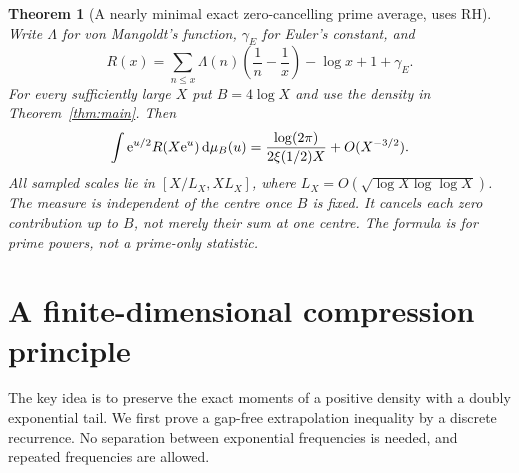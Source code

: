 \documentclass[11pt]{article}
\newtheorem{theorem}{Theorem}[section]
\theoremstyle{remark}\newtheorem{remark}[theorem]{Remark}
\begin{document}
\begin{theorem}[A nearly minimal exact zero-cancelling prime average, uses RH]\label{thm:primes}
Write $\Lambda$ for von Mangoldt's function, $\gamma_E$ for Euler's constant, and
\[
R(x)=\sum_{n\le x}\Lambda(n)\left(\frac1n-\frac1x\right)-\log x+1+\gamma_E.
\]
For every sufficiently large $X$ put $B=4\log X$ and use the density in Theorem~\ref{thm:main}. Then
\begin{equation}\label{eq:primeavg}
\int \mathrm e^{u/2}R(X\mathrm e^u)\,\mathrm d\mu_B(u)
=\frac{\log(2\pi)}{2\xi(1/2)X}+O(X^{-3/2}).
\end{equation}
All sampled scales lie in $[X/L_X,XL_X]$, where $L_X=O(\sqrt{\log X\log\log X})$. The measure is independent of the centre once $B$ is fixed. It cancels each zero contribution up to $B$, not merely their sum at one centre. The formula is for prime powers, not a prime-only statistic.
\end{theorem}

\section{A finite-dimensional compression principle}
\label{sec:compression}
The key idea is to preserve the exact moments of a positive density with a doubly exponential tail. We first prove a gap-free extrapolation inequality by a discrete recurrence. No separation between exponential frequencies is needed, and repeated frequencies are allowed.
\end{document}
